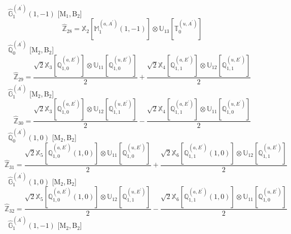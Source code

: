 \documentclass[fleqn,10pt,landscape]{article}
\begin{document}
\begin{itemize}
\noindent {} $\,\,\,\hat{\mathbb{G}}_{1}^{(A^{\prime})}(1,-1)$ [M$_{1}$,\,B$_{2}$]
\begin{dmath*}
\hat{\mathbb{Z}}_{28}=\mathbb{X}_{2}[\mathbb{M}_{1}^{(a,A^{\prime})}(1,-1)] \otimes\mathbb{U}_{13}[\mathbb{T}_{0}^{(u,A^{\prime})}]
\end{dmath*}
\vspace{4mm}
\noindent {} $\,\,\,\hat{\mathbb{Q}}_{0}^{(A^{\prime})}$ [M$_{2}$,\,B$_{2}$]
\begin{dmath*}
\hat{\mathbb{Z}}_{29}=\frac{\sqrt{2} \mathbb{X}_{3}[\mathbb{Q}_{1,0}^{(a,E^{\prime})}] \otimes\mathbb{U}_{11}[\mathbb{Q}_{1,0}^{(u,E^{\prime})}]}{2} + \frac{\sqrt{2} \mathbb{X}_{4}[\mathbb{Q}_{1,1}^{(a,E^{\prime})}] \otimes\mathbb{U}_{12}[\mathbb{Q}_{1,1}^{(u,E^{\prime})}]}{2}
\end{dmath*}
\vspace{4mm}
\noindent {} $\,\,\,\hat{\mathbb{G}}_{1}^{(A^{\prime})}$ [M$_{2}$,\,B$_{2}$]
\begin{dmath*}
\hat{\mathbb{Z}}_{30}=\frac{\sqrt{2} \mathbb{X}_{3}[\mathbb{Q}_{1,0}^{(a,E^{\prime})}] \otimes\mathbb{U}_{12}[\mathbb{Q}_{1,1}^{(u,E^{\prime})}]}{2} - \frac{\sqrt{2} \mathbb{X}_{4}[\mathbb{Q}_{1,1}^{(a,E^{\prime})}] \otimes\mathbb{U}_{11}[\mathbb{Q}_{1,0}^{(u,E^{\prime})}]}{2}
\end{dmath*}
\vspace{4mm}
\noindent {} $\,\,\,\hat{\mathbb{Q}}_{0}^{(A^{\prime})}(1,0)$ [M$_{2}$,\,B$_{2}$]
\begin{dmath*}
\hat{\mathbb{Z}}_{31}=\frac{\sqrt{2} \mathbb{X}_{5}[\mathbb{Q}_{1,0}^{(a,E^{\prime})}(1,0)] \otimes\mathbb{U}_{11}[\mathbb{Q}_{1,0}^{(u,E^{\prime})}]}{2} + \frac{\sqrt{2} \mathbb{X}_{6}[\mathbb{Q}_{1,1}^{(a,E^{\prime})}(1,0)] \otimes\mathbb{U}_{12}[\mathbb{Q}_{1,1}^{(u,E^{\prime})}]}{2}
\end{dmath*}
\vspace{4mm}
\noindent {} $\,\,\,\hat{\mathbb{G}}_{1}^{(A^{\prime})}(1,0)$ [M$_{2}$,\,B$_{2}$]
\begin{dmath*}
\hat{\mathbb{Z}}_{32}=\frac{\sqrt{2} \mathbb{X}_{5}[\mathbb{Q}_{1,0}^{(a,E^{\prime})}(1,0)] \otimes\mathbb{U}_{12}[\mathbb{Q}_{1,1}^{(u,E^{\prime})}]}{2} - \frac{\sqrt{2} \mathbb{X}_{6}[\mathbb{Q}_{1,1}^{(a,E^{\prime})}(1,0)] \otimes\mathbb{U}_{11}[\mathbb{Q}_{1,0}^{(u,E^{\prime})}]}{2}
\end{dmath*}
\vspace{4mm}
\noindent {} $\,\,\,\hat{\mathbb{G}}_{1}^{(A^{\prime})}(1,-1)$ [M$_{2}$,\,B$_{2}$]

\end{itemize}
\end{document}
